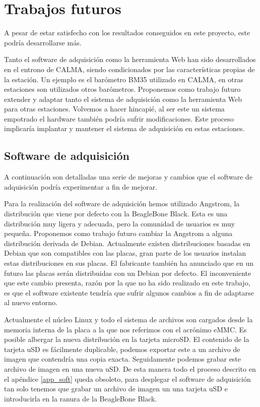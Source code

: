 \section{Trabajos futuros}
	A pesar de estar satisfecho con los resultados conseguidos en este proyecto, este podría desarrollarse más.
	\par
	Tanto el software de adquisición como la herramienta Web han sido desarrollados en el entrono de CALMA, siendo condicionados por las
	características propias de la estación. Un ejemplo es el barómetro BM35 utilizado en CALMA, en otras estaciones son utilizados otros
	barómetros. Proponemos como trabajo futuro extender y adaptar tanto el sistema de adquisición como la herramienta Web para otras estaciones.
	Volvemos a hacer hincapié, al ser este un sistema empotrado el hardware también podría sufrir modificaciones. Este proceso implicaría
	implantar y mantener el sistema de adquisición en estas estaciones.
	\subsection{Software de adquisición}
		A continuación son detalladas una serie de mejoras y cambios que el software de adquisición podría experimentar a fin de mejorar.
		\begin{description}[style=unboxed,leftmargin=0cm,labelwidth=1cm]
			\item[Debian]
				Para la realización del software de adquisición hemos utilizado Angstrom, la distribución que viene por defecto con la
				BeagleBone Black. Esta es una distribución muy ligera y adecuada, pero la comunidad de usuarios es muy pequeña.
				Proponemos como trabajo futuro cambiar la Angstrom a alguna distribución derivada de Debian. Actualmente existen
				distribuciones basadas en Debian que son compatibles con las placas, gran parte de los usuarios instalan estas
				distribuciones en sus placas. El fabricante también ha anunciado que en un futuro las placas serán distribuidas con un
				Debian por defecto. El inconveniente que este cambio presenta, razón por la que no ha sido realizado en este trabajo,
				es que el software existente tendría que sufrir algunos cambios a fin de adaptarse al nuevo entorno.
				\par
				Actualmente el núcleo Linux y todo el sistema de archivos son cargados desde la memoria interna de la placa a la que
				nos referimos con el acrónimo eMMC. Es posible albergar la nueva distribución en la tarjeta microSD. El contenido de
				la tarjeta uSD es fácilmente duplicable, podemos exportar este a un archivo de imagen que contendría una copia exacta.
				Seguidamente podemos grabar este archivo de imagen en una nueva uSD. De esta manera todo el proceso descrito en el
				apéndice \ref{app_soft} queda obsoleto, para desplegar el software de adquisición  tan solo tenemos que grabar un
				archivo de imagen un una tarjeta uSD e introducirla en la ranura de la BeagleBone Black. 
		\end{description}
